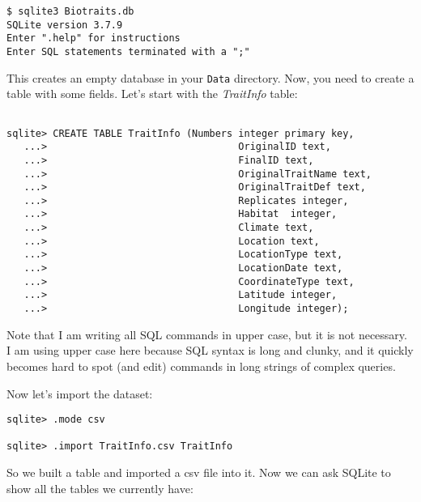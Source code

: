 \begin{lstlisting}
$ sqlite3 Biotraits.db
SQLite version 3.7.9
Enter ".help" for instructions
Enter SQL statements terminated with a ";"
\end{lstlisting}
This creates an empty database in your {\tt Data} directory. Now, you 
need to create a table with some fields. Let's start with the {\it TraitInfo} table:
\begin{lstlisting}
	
sqlite> CREATE TABLE TraitInfo (Numbers integer primary key,
   ...>                                 OriginalID text,
   ...>                                 FinalID text,
   ...>                                 OriginalTraitName text,
   ...>                                 OriginalTraitDef text,
   ...>                                 Replicates integer,
   ...>                                 Habitat  integer,               
   ...>                                 Climate text,
   ...>                                 Location text,
   ...>                                 LocationType text,
   ...>                                 LocationDate text,
   ...>                                 CoordinateType text,
   ...>                                 Latitude integer,
   ...>                                 Longitude integer);

\end{lstlisting}

Note that I am writing all SQL commands in upper case, but it is not 
necessary. I am using upper case here because SQL syntax is long and 
clunky, and it quickly becomes hard to spot (and edit) commands in long 
strings of complex queries.     

Now let's import the dataset:

\begin{lstlisting}
sqlite> .mode csv

sqlite> .import TraitInfo.csv TraitInfo
\end{lstlisting}

So we built a table and imported a csv file into it. Now we can ask 
SQLite to show all the tables we currently have:

% 
% 

